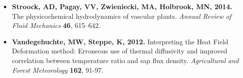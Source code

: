 \documentclass[usepdftitle=false]{beamer}
\newenvironment{changemargin}[2]{%
	\begin{list}{}{%
			\setlength{\topsep}{0pt}%
			\setlength{\leftmargin}{#1}%
			\setlength{\rightmargin}{#2}%
			\setlength{\listparindent}{\parindent}%
			\setlength{\itemindent}{\parindent}%
			\setlength{\parsep}{\parskip}%
		}%
		\item[]}
	{\end{list}
}
\begin{document}
\begin{frame}[t]
\begin{changemargin}{-2em}{-2em}
\begin{itemize}
			\item \textbf{Stroock, AD, Pagay, VV, Zwieniecki, MA, Holbrook, MN, 2014.} The physicochemical hydrodynamics of vascular plants. \textit{Annual Review of Fluid Mechanics} \textbf{46}, 615--642.
			\item \textbf{Vandegehuchte, MW,  Steppe, K, 2012.} Interpreting the Heat Field Deformation method: Erroneous use of thermal diffusivity and improved correlation between temperature ratio and sap flux density. \textit{Agricultural and Forest Meteorology} \textbf{162}, 91-97.
		\end{itemize}
	\end{changemargin}
\end{frame}
\end{document}
